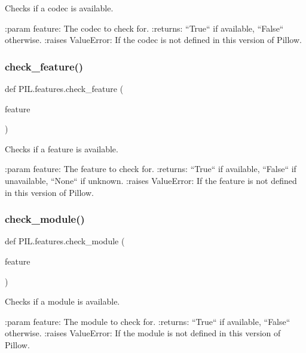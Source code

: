 \begin{DoxyVerb}Checks if a codec is available.

:param feature: The codec to check for.
:returns: ``True`` if available, ``False`` otherwise.
:raises ValueError: If the codec is not defined in this version of Pillow.
\end{DoxyVerb}
 \mbox{\label{namespacePIL_1_1features_aa770cfc9e1bbd82b811d3509601bac7a}} 
\subsubsection{\texorpdfstring{check\+\_\+feature()}{check\_feature()}}
{\footnotesize\ttfamily def P\+I\+L.\+features.\+check\+\_\+feature (\begin{DoxyParamCaption}\item[{}]{feature }\end{DoxyParamCaption})}

\begin{DoxyVerb}Checks if a feature is available.

:param feature: The feature to check for.
:returns: ``True`` if available, ``False`` if unavailable, ``None`` if unknown.
:raises ValueError: If the feature is not defined in this version of Pillow.
\end{DoxyVerb}
 \mbox{\label{namespacePIL_1_1features_a433b9d375d445e4b537e4fdd9d266172}} 
\subsubsection{\texorpdfstring{check\+\_\+module()}{check\_module()}}
{\footnotesize\ttfamily def P\+I\+L.\+features.\+check\+\_\+module (\begin{DoxyParamCaption}\item[{}]{feature }\end{DoxyParamCaption})}

\begin{DoxyVerb}Checks if a module is available.

:param feature: The module to check for.
:returns: ``True`` if available, ``False`` otherwise.
:raises ValueError: If the module is not defined in this version of Pillow.
\end{DoxyVerb}
 \mbox{\label{namespacePIL_1_1features_aa5e618116b48b46ffc6a6e0640a353e1}} 
